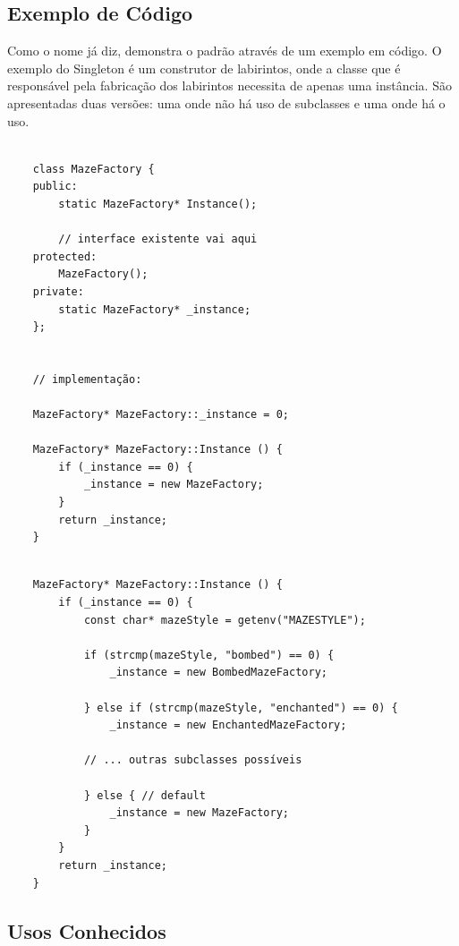 \subsection*{Exemplo de Código}

Como o nome já diz, demonstra o padrão através de 
um exemplo em código. O exemplo do Singleton é um 
construtor de labirintos, onde a classe que é 
responsável pela fabricação dos labirintos necessita 
de apenas uma instância. São apresentadas duas versões: 
uma onde não há uso de subclasses e uma onde há o 
uso.

\begin{lstlisting}[caption={Exemplo de Singleton sem subclasses \cite{gamma:1995}},label=singletonnosub]
    
    class MazeFactory {
    public:
        static MazeFactory* Instance();

        // interface existente vai aqui
    protected:
        MazeFactory();
    private:
        static MazeFactory* _instance;
    };


    // implementação:

    MazeFactory* MazeFactory::_instance = 0;

    MazeFactory* MazeFactory::Instance () {
        if (_instance == 0) {
            _instance = new MazeFactory;
        } 
        return _instance;
    } 

\end{lstlisting}


\begin{lstlisting}[caption={Exemplo de Singleton com subclasses \cite{gamma:1995}},label=singletonsub]
    
    MazeFactory* MazeFactory::Instance () {
        if (_instance == 0) {
            const char* mazeStyle = getenv("MAZESTYLE");

            if (strcmp(mazeStyle, "bombed") == 0) {
                _instance = new BombedMazeFactory;

            } else if (strcmp(mazeStyle, "enchanted") == 0) {
                _instance = new EnchantedMazeFactory;

            // ... outras subclasses possíveis

            } else { // default
                _instance = new MazeFactory;
            }
        }
        return _instance;
    } 

\end{lstlisting}


\subsection*{Usos Conhecidos}

